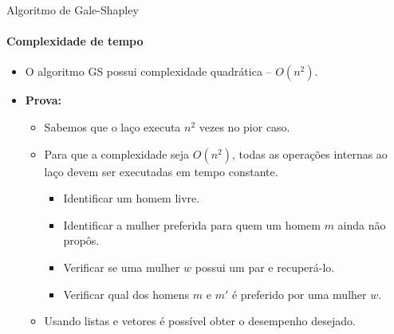 \begin{frame}{Algoritmo de Gale-Shapley}
\framesubtitle{Complexidade de tempo}

\begin{itemize}
	\item {\color{magenta}O algoritmo GS possui complexidade quadrática -- $O(n^2)$.}
	
	\medskip
	\item \textbf{Prova:}
	\begin{itemize}
		\item Sabemos que o laço executa $n^2$ vezes no pior caso.
		\item Para que a complexidade seja $O(n^2)$, todas as operações internas ao laço devem ser executadas em tempo constante.
		\begin{itemize}
			\item Identificar um homem livre.
			\item Identificar a mulher preferida para quem um homem $m$ ainda não propôs.
			\item Verificar se uma mulher $w$ possui um par e recuperá-lo.
			\item Verificar qual dos homens $m$ e $m'$ é preferido por uma mulher $w$.
		\end{itemize}
		\item Usando listas e vetores é possível obter o desempenho desejado.
	\end{itemize}
\end{itemize}
\end{frame}



